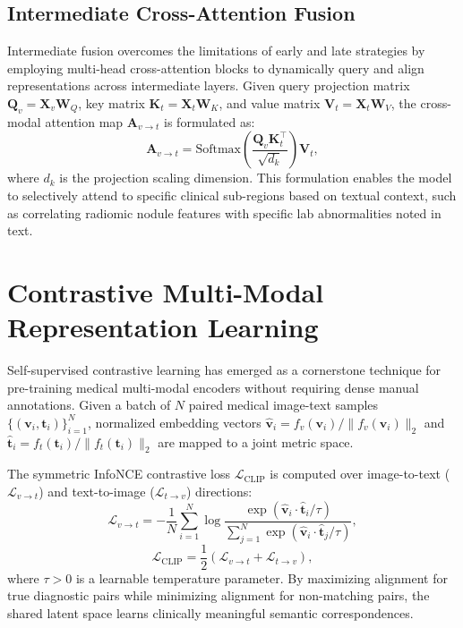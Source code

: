 \documentclass[final,3p,times]{elsarticle}
\begin{document}
\subsection{Intermediate Cross-Attention Fusion}
Intermediate fusion overcomes the limitations of early and late strategies by employing multi-head cross-attention blocks to dynamically query and align representations across intermediate layers. Given query projection matrix $\mathbf{Q}_v = \mathbf{X}_v \mathbf{W}_Q$, key matrix $\mathbf{K}_t = \mathbf{X}_t \mathbf{W}_K$, and value matrix $\mathbf{V}_t = \mathbf{X}_t \mathbf{W}_V$, the cross-modal attention map $\mathbf{A}_{v \to t}$ is formulated as:
\begin{equation}
\label{eq:cross_att}
\mathbf{A}_{v \to t} = \text{Softmax}\left( \frac{\mathbf{Q}_v \mathbf{K}_t^\top}{\sqrt{d_k}} \right) \mathbf{V}_t,
\end{equation}
where $d_k$ is the projection scaling dimension. This formulation enables the model to selectively attend to specific clinical sub-regions based on textual context, such as correlating radiomic nodule features with specific lab abnormalities noted in text.

\section{Contrastive Multi-Modal Representation Learning}
\label{sec:contrastive}
Self-supervised contrastive learning has emerged as a cornerstone technique for pre-training medical multi-modal encoders without requiring dense manual annotations. Given a batch of $N$ paired medical image-text samples $\{(\mathbf{v}_i, \mathbf{t}_i)\}_{i=1}^N$, normalized embedding vectors $\mathbf{\hat{v}}_i = f_v(\mathbf{v}_i) / \|f_v(\mathbf{v}_i)\|_2$ and $\mathbf{\hat{t}}_i = f_t(\mathbf{t}_i) / \|f_t(\mathbf{t}_i)\|_2$ are mapped to a joint metric space.

The symmetric InfoNCE contrastive loss $\mathcal{L}_{\text{CLIP}}$ is computed over image-to-text ($\mathcal{L}_{v \to t}$) and text-to-image ($\mathcal{L}_{t \to v}$) directions:
\begin{equation}
\mathcal{L}_{v \to t} = -\frac{1}{N} \sum_{i=1}^N \log \frac{\exp\left( \mathbf{\hat{v}}_i \cdot \mathbf{\hat{t}}_i / \tau \right)}{\sum_{j=1}^N \exp\left( \mathbf{\hat{v}}_i \cdot \mathbf{\hat{t}}_j / \tau \right)},
\end{equation}
\begin{equation}
\mathcal{L}_{\text{CLIP}} = \frac{1}{2} \left( \mathcal{L}_{v \to t} + \mathcal{L}_{t \to v} \right),
\end{equation}
where $\tau > 0$ is a learnable temperature parameter. By maximizing alignment for true diagnostic pairs while minimizing alignment for non-matching pairs, the shared latent space learns clinically meaningful semantic correspondences.
\end{document}

